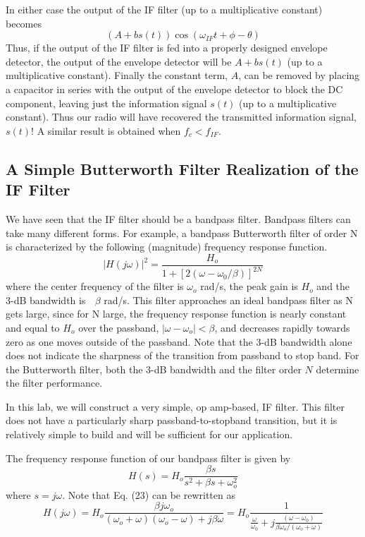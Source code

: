 \documentclass[12pt]{article}
\begin{document}
In either case the output of the IF filter (up to a multiplicative constant) becomes
$$(A+bs(t))\cos(\omega_{IF}t+\phi-\theta)$$
Thus, if the output of the IF filter is fed into a properly designed envelope detector, the output
of the envelope detector will be $A+bs(t)$ (up to a multiplicative constant). Finally the constant term, $A$,
can be removed by placing a capacitor in series with the output of the envelope detector to
block the DC component, leaving just the information signal $s(t)$ (up to a multiplicative constant). Thus
our radio will have recovered the transmitted information signal, $s(t)$! A similar result is obtained when
$f_c<f_{IF}$. 
\subsection{A Simple Butterworth Filter Realization of the IF Filter}
We have seen that the IF filter should be a bandpass filter. Bandpass filters can take many different
forms. For example, a bandpass Butterworth filter of order N is characterized by the following (magnitude)
frequency response function.
\begin{equation}
|H(j\omega)|^2=\frac{H_o}{1+[2(\omega-\omega_0/\beta)]^{2N}}
\end{equation}
where the center frequency of the filter is $\omega_o$ rad/s, the peak gain is $H_o$ and the 3-dB bandwidth is 
$\beta$ rad/s. This filter approaches an ideal bandpass filter as N gets large, since for N large, the frequency
response function is nearly constant and equal to $H_o$ over the passband, $|\omega-\omega_o|<\beta$, and decreases rapidly
towards zero as one moves outside of the passband. Note that the 3-dB bandwidth alone does not indicate
the sharpness of the transition from passband to stop band. For the Butterworth filter, both the 3-dB
bandwidth and the filter order $N$ determine the filter performance.
\par In this lab, we will construct a very simple, op amp-based, IF filter. This filter does not have a particularly
sharp passband-to-stopband transition, but it is relatively simple to build and will be sufficient for our
application.
\par The frequency response function of our bandpass filter is given by
\begin{equation}
H(s)=H_o\frac{\beta s}{s^2+\beta s+\omega_o^2}
\end{equation}
where $s=j\omega$. Note that Eq. (23) can be rewritten as
\begin{equation}
H(j\omega)=H_o\frac{\beta j\omega_o}{(\omega_o+\omega)(\omega_o-\omega)+j\beta\omega}=H_o\frac{1}{\frac{\omega}{\omega_0}+j\frac{(\omega-\omega_0)}{\beta\omega_o/(\omega_o+\omega)}}
\end{equation}
\end{document}
